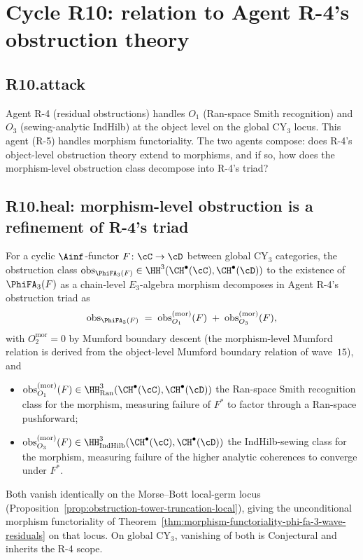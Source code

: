 \section*{Cycle R10: relation to Agent R-4's obstruction theory}

\subsection*{R10.attack}

Agent R-4 (residual obstructions) handles $O_1$ (Ran-space Smith
recognition) and $O_3$ (sewing-analytic IndHilb) at the object level
on the global CY$_3$ locus.  This agent (R-5) handles morphism
functoriality.  The two agents compose: does R-4's object-level
obstruction theory extend to morphisms, and if so, how does the
morphism-level obstruction class decompose into R-4's triad?

\subsection*{R10.heal: morphism-level obstruction is a refinement of R-4's triad}

\begin{proposition}
\label{prop:morphism-obstruction-refinement-R4}
\ClaimStatusProvedHere
For a cyclic $\Ainf$-functor $F \colon \cC \to \cD$ between global
CY$_3$ categories, the obstruction class
$\mathrm{obs}_{\PhiFA_3(F)} \in \HH^3(\CH^\bullet(\cC), \CH^\bullet(\cD))$
to the existence of $\PhiFA_3(F)$ as a chain-level $E_3$-algebra
morphism decomposes in Agent R-4's obstruction triad as
\[
  \mathrm{obs}_{\PhiFA_3(F)}
  \;=\;
  \mathrm{obs}^{(\text{mor})}_{O_1}(F)
  \;+\;
  \mathrm{obs}^{(\text{mor})}_{O_3}(F),
\]
with $O_2^{\mathrm{mor}} = 0$ by Mumford boundary descent (the
morphism-level Mumford relation is derived from the object-level
Mumford boundary relation of wave~$15$), and
\begin{itemize}
 \item $\mathrm{obs}^{(\text{mor})}_{O_1}(F) \in \HH^3_{\mathrm{Ran}}
       (\CH^\bullet(\cC), \CH^\bullet(\cD))$ the Ran-space Smith
       recognition class for the morphism, measuring failure of $F^*$
       to factor through a Ran-space pushforward;
 \item $\mathrm{obs}^{(\text{mor})}_{O_3}(F) \in \HH^3_{\mathrm{IndHilb}}
       (\CH^\bullet(\cC), \CH^\bullet(\cD))$ the IndHilb-sewing class
       for the morphism, measuring failure of the higher analytic
       coherences to converge under $F^*$.
\end{itemize}
Both vanish identically on the Morse--Bott local-germ locus
(Proposition~\ref{prop:obstruction-tower-truncation-local}), giving
the unconditional morphism functoriality of
Theorem~\ref{thm:morphism-functoriality-phi-fa-3-wave-residuals} on
that locus.  On global CY$_3$, vanishing of both is Conjectural and
inherits the R-4 scope.
\end{proposition}

